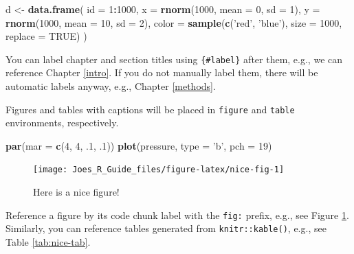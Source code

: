 \documentclass[
]{book}
\newenvironment{Shaded}{\begin{snugshade}}{\end{snugshade}}
\newcommand{\DataTypeTok}[1]{\textcolor[rgb]{0.13,0.29,0.53}{#1}}
\newcommand{\DecValTok}[1]{\textcolor[rgb]{0.00,0.00,0.81}{#1}}
\newcommand{\FloatTok}[1]{\textcolor[rgb]{0.00,0.00,0.81}{#1}}
\newcommand{\KeywordTok}[1]{\textcolor[rgb]{0.13,0.29,0.53}{\textbf{#1}}}
\newcommand{\NormalTok}[1]{#1}
\newcommand{\OperatorTok}[1]{\textcolor[rgb]{0.81,0.36,0.00}{\textbf{#1}}}
\newcommand{\OtherTok}[1]{\textcolor[rgb]{0.56,0.35,0.01}{#1}}
\newcommand{\StringTok}[1]{\textcolor[rgb]{0.31,0.60,0.02}{#1}}
\begin{document}
\begin{Shaded}
\begin{Highlighting}[]
\NormalTok{d <-}\StringTok{ }\KeywordTok{data.frame}\NormalTok{(     }
  \DataTypeTok{id =} \DecValTok{1}\OperatorTok{:}\DecValTok{1000}\NormalTok{,     }
  \DataTypeTok{x =} \KeywordTok{rnorm}\NormalTok{(}\DecValTok{1000}\NormalTok{, }\DataTypeTok{mean =} \DecValTok{0}\NormalTok{, }\DataTypeTok{sd =} \DecValTok{1}\NormalTok{),    }
  \DataTypeTok{y =} \KeywordTok{rnorm}\NormalTok{(}\DecValTok{1000}\NormalTok{, }\DataTypeTok{mean =} \DecValTok{10}\NormalTok{, }\DataTypeTok{sd =} \DecValTok{2}\NormalTok{),     }
  \DataTypeTok{color =} \KeywordTok{sample}\NormalTok{(}\KeywordTok{c}\NormalTok{(}\StringTok{'red'}\NormalTok{, }\StringTok{'blue'}\NormalTok{), }\DataTypeTok{size =} \DecValTok{1000}\NormalTok{, }\DataTypeTok{replace =} \OtherTok{TRUE}\NormalTok{)    }
\NormalTok{) }
\end{Highlighting}
\end{Shaded}

You can label chapter and section titles using \texttt{\{\#label\}} after them, e.g., we can reference Chapter \ref{intro}. If you do not manually label them, there will be automatic labels anyway, e.g., Chapter \ref{methods}.

Figures and tables with captions will be placed in \texttt{figure} and \texttt{table} environments, respectively.

\begin{Shaded}
\begin{Highlighting}[]
\KeywordTok{par}\NormalTok{(}\DataTypeTok{mar =} \KeywordTok{c}\NormalTok{(}\DecValTok{4}\NormalTok{, }\DecValTok{4}\NormalTok{, }\FloatTok{.1}\NormalTok{, }\FloatTok{.1}\NormalTok{))}
\KeywordTok{plot}\NormalTok{(pressure, }\DataTypeTok{type =} \StringTok{'b'}\NormalTok{, }\DataTypeTok{pch =} \DecValTok{19}\NormalTok{)}
\end{Highlighting}
\end{Shaded}

\begin{figure}

{\centering \texttt{[image: Joes\_R\_Guide\_files/figure-latex/nice-fig-1]} 

}

\caption{Here is a nice figure!}\label{fig:nice-fig}
\end{figure}

Reference a figure by its code chunk label with the \texttt{fig:} prefix, e.g., see Figure \ref{fig:nice-fig}. Similarly, you can reference tables generated from \texttt{knitr::kable()}, e.g., see Table \ref{tab:nice-tab}.
\end{document}
